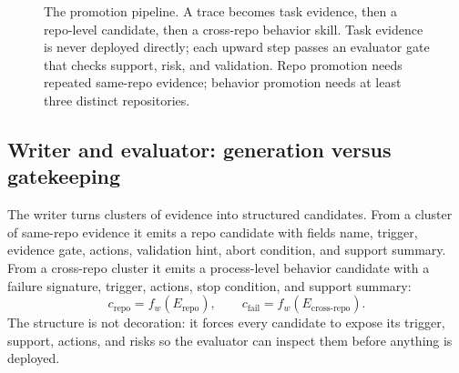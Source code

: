 \begin{figure}[t]
\centering
{}
\caption{The promotion pipeline. A trace becomes task evidence, then a repo-level
candidate, then a cross-repo behavior skill. Task evidence is never deployed
directly; each upward step passes an evaluator gate that checks support, risk,
and validation. Repo promotion needs repeated same-repo evidence; behavior
promotion needs at least three distinct repositories.}
\label{fig:pipeline}
\end{figure}

\subsection{Writer and evaluator: generation versus gatekeeping}

The writer turns clusters of evidence into structured candidates. From a cluster
of same-repo evidence it emits a repo candidate with fields name, trigger,
evidence gate, actions, validation hint, abort condition, and support summary.
From a cross-repo cluster it emits a process-level behavior candidate with a
failure signature, trigger, actions, stop condition, and support summary:
\[
c_{\mathrm{repo}} = f_w(E_{\mathrm{repo}}), \qquad
c_{\mathrm{fail}} = f_w(E_{\mathrm{cross\text{-}repo}}).
\]
The structure is not decoration: it forces every candidate to expose its trigger,
support, actions, and risks so the evaluator can inspect them before anything is
deployed.

